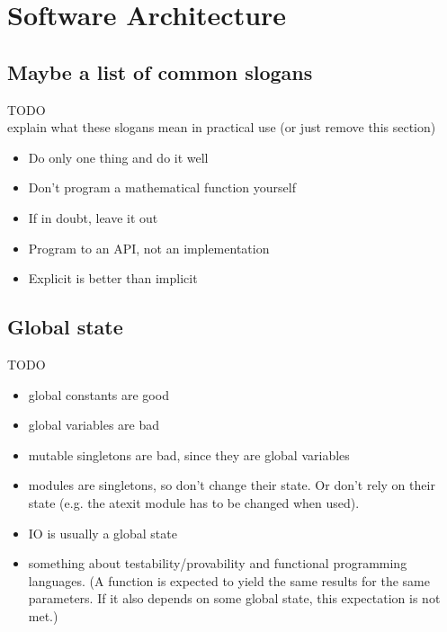 
\chapter{Software Architecture}
	\section{Maybe a list of common slogans}
		TODO\\
		explain what these slogans mean in practical use (or just remove this section)
		\begin{itemize}
			\item Do only one thing and do it well
			\item Don't program a mathematical function yourself
			\item If in doubt, leave it out
			\item Program to an API, not an implementation
			\item Explicit is better than implicit
		\end{itemize}


	\section{Global state}
		TODO\\
		\begin{itemize}
			\item global constants are good
			\item global variables are bad
			\item mutable singletons are bad, since they are global variables
			\item modules are singletons, so don't change their state. Or don't rely on their state (e.g. the atexit module has to be changed when used).
			\item IO is usually a global state
			\item something about testability/provability and functional programming languages. (A function is expected to yield the same results for the same parameters. If it also depends on some global state, this expectation is not met.)
		\end{itemize}


